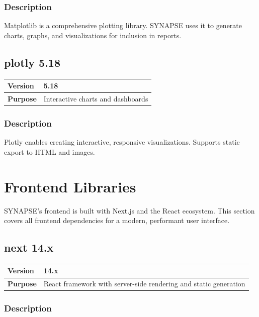 \documentclass[12pt,a4paper]{report}
\begin{document}
\subsection{Description}

Matplotlib is a comprehensive plotting library. SYNAPSE uses it to generate charts, graphs, and visualizations for inclusion in reports.

\section{plotly 5.18}

\begin{tabular}{|p{4cm}|p{10cm}|}
\hline
\textbf{Version} & 5.18 \\
\hline
\textbf{Purpose} & Interactive charts and dashboards \\
\hline
\end{tabular}

\subsection{Description}

Plotly enables creating interactive, responsive visualizations. Supports static export to HTML and images.

\chapter{Frontend Libraries}

SYNAPSE's frontend is built with Next.js and the React ecosystem. This section covers all frontend dependencies for a modern, performant user interface.

\section{next 14.x}

\begin{tabular}{|p{4cm}|p{10cm}|}
\hline
\textbf{Version} & 14.x \\
\hline
\textbf{Purpose} & React framework with server-side rendering and static generation \\
\hline
\end{tabular}

\subsection{Description}
\end{document}
